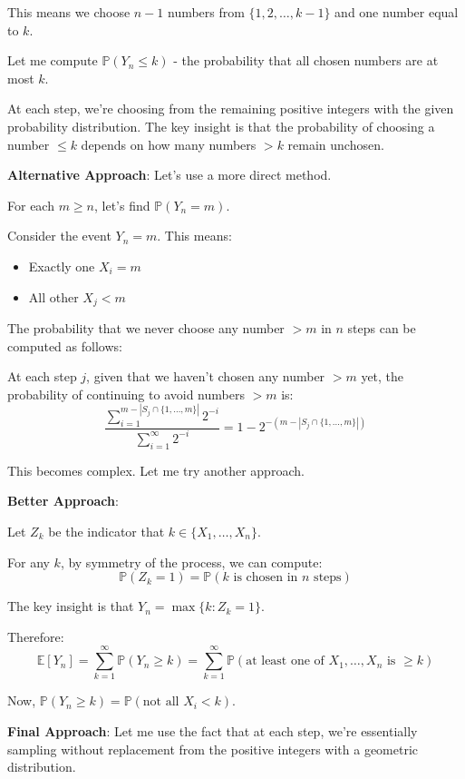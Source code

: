 \documentclass[12pt,a4paper]{article}
\theoremstyle{definition}
\begin{document}
    This means we choose $n-1$ numbers from $\{1, 2, \ldots, k-1\}$ and one number equal to $k$.

    Let me compute $\mathbb{P}(Y_n \leq k)$ - the probability that all chosen numbers are at most $k$.

    At each step, we're choosing from the remaining positive integers with the given probability distribution. The key insight is that the probability of choosing a number $\leq k$ depends on how many numbers $> k$ remain unchosen.

    \textbf{Alternative Approach}: Let's use a more direct method.

    For each $m \geq n$, let's find $\mathbb{P}(Y_n = m)$.

    Consider the event $Y_n = m$. This means:
    \begin{itemize}
        \item Exactly one $X_i = m$
        \item All other $X_j < m$
    \end{itemize}

    The probability that we never choose any number $> m$ in $n$ steps can be computed as follows:

    At each step $j$, given that we haven't chosen any number $> m$ yet, the probability of continuing to avoid numbers $> m$ is:
    $$\frac{\sum_{i=1}^{m-|S_j \cap \{1,\ldots,m\}|} 2^{-i}}{\sum_{i=1}^{\infty} 2^{-i}} = 1 - 2^{-(m-|S_j \cap \{1,\ldots,m\}|)}$$

    This becomes complex. Let me try another approach.

    \textbf{Better Approach}:

    Let $Z_k$ be the indicator that $k \in \{X_1, \ldots, X_n\}$.

    For any $k$, by symmetry of the process, we can compute:
    $$\mathbb{P}(Z_k = 1) = \mathbb{P}(k \text{ is chosen in } n \text{ steps})$$

    The key insight is that $Y_n = \max\{k : Z_k = 1\}$.

    Therefore:
    $$\mathbb{E}[Y_n] = \sum_{k=1}^{\infty} \mathbb{P}(Y_n \geq k) = \sum_{k=1}^{\infty} \mathbb{P}(\text{at least one of } X_1, \ldots, X_n \text{ is } \geq k)$$

    Now, $\mathbb{P}(Y_n \geq k) = \mathbb{P}(\text{not all } X_i < k)$.

    \textbf{Final Approach}: Let me use the fact that at each step, we're essentially sampling without replacement from the positive integers with a geometric distribution.
\end{document}
